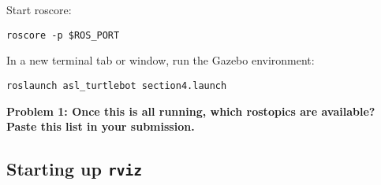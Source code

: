 \documentclass{article}
\begin{document}



Start roscore:
\begin{lstlisting}
roscore -p $ROS_PORT
\end{lstlisting}

In a new terminal tab or window, run the Gazebo environment:
\begin{lstlisting}
roslaunch asl_turtlebot section4.launch
\end{lstlisting}

{\bf Problem 1: Once this is all running, which rostopics are available? Paste this list in your submission.}

\subsection{Starting up \texttt{rviz}}



\end{document}
